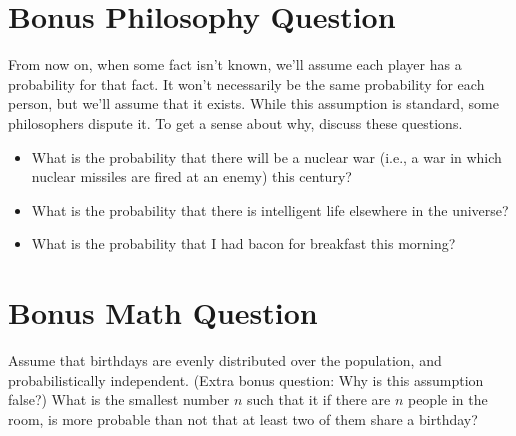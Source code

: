 \section{Bonus Philosophy Question}
\label{bonusphilosophyquestion}

From now on, when some fact isn't known, we'll assume each player has a probability for that fact. It won't necessarily be the same probability for each person, but we'll assume that it exists. While this assumption is standard, some philosophers dispute it. To get a sense about why, discuss these questions.

\begin{itemize}
\item{} What is the probability that there will be a nuclear war (i.e., a war in which nuclear missiles are fired at an enemy) this century?

\item{} What is the probability that there is intelligent life elsewhere in the universe?

\item{} What is the probability that I had bacon for breakfast this morning?

\end{itemize}

\section{Bonus Math Question}
\label{bonusmathquestion}

Assume that birthdays are evenly distributed over the population, and probabilistically independent. (Extra bonus question: Why is this assumption false?) What is the smallest number $n$ such that it if there are $n$ people in the room, is more probable than not that at least two of them share a birthday?


